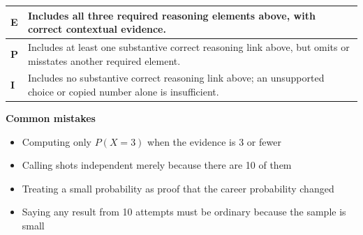 \documentclass[11pt]{article}
\begin{document}
{\small\renewcommand{\arraystretch}{1.25}
\noindent\begin{tabular}{|p{0.5in}|p{5.9in}|}
\hline
\textbf{E} & Includes all three required reasoning elements above, with correct contextual evidence. \\ \hline
\textbf{P} & Includes at least one substantive correct reasoning link above, but omits or misstates another required element. \\ \hline
\textbf{I} & Includes no substantive correct reasoning link above; an unsupported choice or copied number alone is insufficient. \\ \hline
\end{tabular}}

\textbf{Common mistakes}
\begin{itemize}[leftmargin=1.5em,itemsep=2pt,topsep=2pt]
  \item Computing only $P(X=3)$ when the evidence is 3 or fewer
  \item Calling shots independent merely because there are 10 of them
  \item Treating a small probability as proof that the career probability changed
  \item Saying any result from 10 attempts must be ordinary because the sample is small
\end{itemize}

\clearpage
{}
\end{document}
